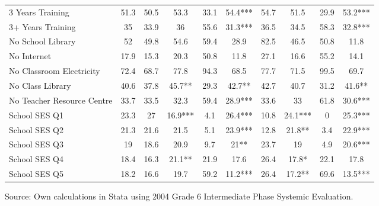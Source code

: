\documentclass[12pt,preprint, authoryear]{article}
\numberwithin{equation}{section}
\numberwithin{figure}{section}
\numberwithin{table}{section}
\begin{document}
\begin{longtable}[htbp] {p{5cm}|c|*{2}{c}|*{2}{c}|*{2}{c}|*{2}{c}}
3 Years Training                 & 51.3         & 50.5                  & 53.3                        & 33.1                          & 54.4***                     & 54.7 & 51.5    & 29.9 & 53.2*** \\
3+ Years Training                & 35           & 33.9                  & 36                          & 55.6                          & 31.3***                     & 36.5 & 34.5    & 58.3 & 32.8*** \\
No School Library                & 52           & 49.8                  & 54.6                        & 59.4                          & 28.9                        & 82.5 & 46.5    & 50.8 & 11.8    \\
No Internet                      & 17.9         & 15.3                  & 20.3                        & 50.8                          & 11.8                        & 27.1 & 16.6    & 55.2 & 14.1    \\
No Classroom Electricity         & 72.4         & 68.7                  & 77.8                        & 94.3                          & 68.5                        & 77.7 & 71.5    & 99.5 & 69.7    \\
No Class Library                 & 40.6         & 37.8                  & 45.7**                      & 29.3                          & 42.7**                      & 42.7 & 40.7    & 31.2 & 41.6**  \\
No Teacher Resource Centre       & 33.7         & 33.5                  & 32.3                        & 59.4                          & 28.9***                     & 33.6 & 33      & 61.8 & 30.6*** \\
School SES Q1                    & 23.3         & 27                    & 16.9***                     & 4.1                           & 26.4***                     & 10.8 & 24.1*** & 0    & 25.3*** \\
School SES Q2                    & 21.3         & 21.6                  & 21.5                        & 5.1                           & 23.9***                     & 12.8 & 21.8**  & 3.4  & 22.9*** \\
School SES Q3                    & 19           & 18.6                  & 20.9                        & 9.7                           & 21**                        & 23.7 & 19      & 4.9  & 20.6*** \\
School SES Q4                    & 18.4         & 16.3                  & 21.1**                      & 21.9                          & 17.6                        & 26.4 & 17.8*   & 22.1 & 17.8    \\
School SES Q5                    & 18.2         & 16.6                  & 19.7                        & 59.2                          & 11.2***                     & 26.4 & 17.2**  & 69.6 & 13.5*** \\ \hline \hline
\end{longtable}\begin{center} Source: Own calculations in Stata using 2004 Grade 6 Intermediate Phase Systemic Evaluation.\end{center}
\end{document}
